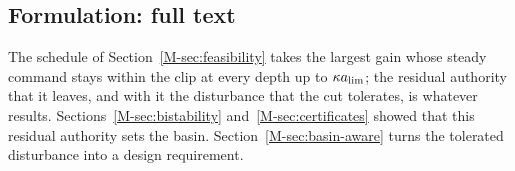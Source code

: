 
\subsection{Formulation: full text}\label{supp:std-ba-form}

The schedule of Section~\ref{M-sec:feasibility} takes the largest gain whose steady command stays within the clip at every depth up to $\kappa a_{\lim}$; the residual authority that it leaves, and with it the disturbance that the cut tolerates, is whatever results. Sections~\ref{M-sec:bistability} and~\ref{M-sec:certificates} showed that this residual authority sets the basin. Section~\ref{M-sec:basin-aware} turns the tolerated disturbance into a design requirement.

